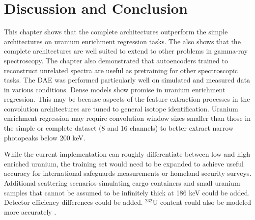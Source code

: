 \section{Discussion and Conclusion}

This chapter shows that the complete architectures outperform the simple architectures on uranium enrichment regression tasks. The also shows that the complete architectures are well suited to extend to other problems in gamma-ray spectroscopy. The chapter also demonstrated that autoencoders trained to reconstruct unrelated spectra are useful as pretraining for other spectroscopic tasks. The DAE was performed particularly well on simulated and measured data in various conditions. Dense models show promise in uranium enrichment regression. This may be because aspects of the feature extraction processes in the convolution architectures are tuned to general isotope identification. Uranium enrichment regression may require convolution window sizes smaller than those in the simple or complete dataset (8 and 16 channels) to better extract narrow photopeaks below 200 keV. 

While the current implementation can roughly differentiate between low and high enriched uranium, the training set would need to be expanded to achieve useful accuracy for international safeguards measurements or homeland security surveys. Additional scattering scenarios simulating cargo containers and small uranium samples that cannot be assumed to be infinitely thick at 186 keV could be added. Detector efficiency differences could be added. $^{232}$U content could also be modeled more accurately \cite{Peurrung2019}.







